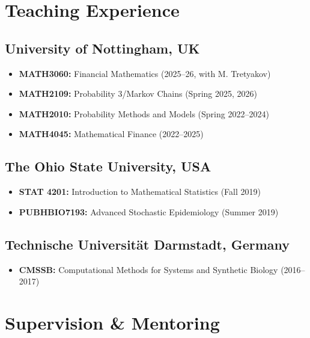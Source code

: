 \documentclass[11pt,a4paper,sans]{moderncv}
\begin{document}
\section{ Teaching Experience}

\subsection{University of Nottingham, UK}
\begin{itemize}
    \item \textbf{MATH3060:} Financial Mathematics (2025--26, with M. Tretyakov)
    \item \textbf{MATH2109:} Probability 3/Markov Chains (Spring 2025, 2026)
    \item \textbf{MATH2010:} Probability Methods and Models (Spring 2022--2024)
    \item \textbf{MATH4045:} Mathematical Finance (2022--2025)
\end{itemize}

\subsection{The Ohio State University, USA}
\begin{itemize}
    \item \textbf{STAT 4201:} Introduction to Mathematical Statistics (Fall 2019)
    \item \textbf{PUBHBIO7193:} Advanced Stochastic Epidemiology (Summer 2019)
\end{itemize}

\subsection{Technische Universität Darmstadt, Germany}
\begin{itemize}
    \item \textbf{CMSSB:} Computational Methods for Systems and Synthetic Biology (2016--2017)
\end{itemize}

\section{ Supervision \& Mentoring}
\end{document}
